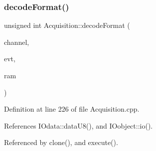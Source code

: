 \subsubsection{\texorpdfstring{decode\+Format()}{decodeFormat()}\hspace{0.1cm}{\footnotesize\ttfamily [2/2]}}
{\footnotesize\ttfamily unsigned int Acquisition\+::decode\+Format (\begin{DoxyParamCaption}\item[{unsigned int}]{channel,  }\item[{unsigned int}]{evt,  }\item[{\hyperlink{classRAM}{R\+AM} $\ast$}]{ram }\end{DoxyParamCaption})\hspace{0.3cm}{\ttfamily [protected]}}



Definition at line 226 of file Acquisition.\+cpp.



References I\+Odata\+::data\+U8(), and I\+Oobject\+::io().



Referenced by clone(), and execute().


